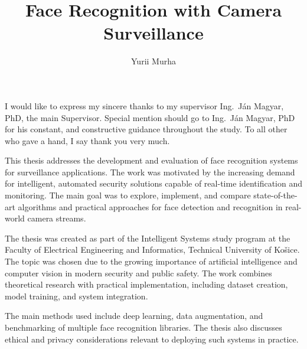 \documentclass[]{tukethesis}
\author{Yurii Murha}
\title{Face Recognition with Camera Surveillance}
\subtitle{}
\begin{document}
\renewcommand\theHfigure{\theHsection.\arabic{figure}}
\renewcommand\theHtable{\theHsection.\arabic{table}}

\firstpage

\titlepage


\errata %
\kerrata

\abstrakte %


\endabstract %

\assignthesis

\declaration

\acknowledgement %
I would like to express my sincere thanks to my supervisor Ing.~Ján Magyar, PhD, the main Supervisor. Special mention should go
to Ing.~Ján Magyar, PhD for his constant, and constructive guidance
throughout the study. To all other who gave a hand, I say thank you
very much.
\endacknowledgement

\preface %
This thesis addresses the development and evaluation of face recognition systems for surveillance applications. The work was motivated by the increasing demand for intelligent, automated security solutions capable of real-time identification and monitoring. The main goal was to explore, implement, and compare state-of-the-art algorithms and practical approaches for face detection and recognition in real-world camera streams.

The thesis was created as part of the Intelligent Systems study program at the Faculty of Electrical Engineering and Informatics, Technical University of Košice. The topic was chosen due to the growing importance of artificial intelligence and computer vision in modern security and public safety. The work combines theoretical research with practical implementation, including dataset creation, model training, and system integration.

The main methods used include deep learning, data augmentation, and benchmarking of multiple face recognition libraries. The thesis also discusses ethical and privacy considerations relevant to deploying such systems in practice.
\endpreface
\end{document}
